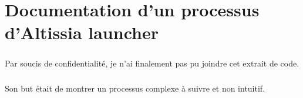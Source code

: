 \chapter{Documentation d'un processus d'Altissia launcher}
\label{ch:altissia-launcher-doc}

\paragraph{}
Par soucis de confidentialité, je n'ai finalement pas pu joindre cet extrait de code.

\paragraph{}
Son but était de montrer un processus complexe à suivre et non intuitif.